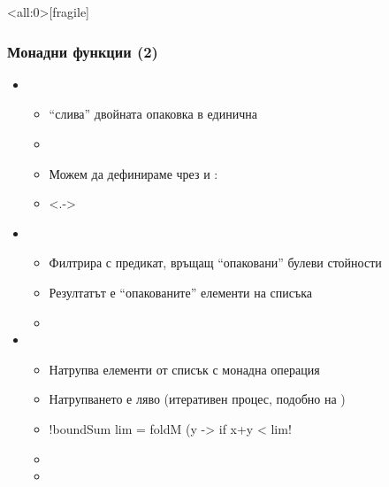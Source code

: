 \documentclass[alsotrans]{beamerswitch}
\begin{document}
\begin{frame}<all:0>[fragile]
  \frametitle{Монадни функции (2)}
  \begin{fixedarea}
    \begin{itemize}[<+->]
    \item {}
      \begin{itemize}
      \item ``слива'' двойната опаковка в единична
      \item {}
      \item Можем да дефинираме \lst{(>>=)} чрез  и :
      \item<.->  
      \end{itemize}
    \item {}
      \begin{itemize}
      \item Филтрира с предикат, връщащ ``опаковани'' булеви стойности
      \item Резултатът е ``опакованите'' елементи на списъка
      \item {}
      \end{itemize}
    \item {}
      \begin{itemize}
      \item Натрупва елементи от списък с монадна операция
      \item Натрупването е ляво (итеративен процес, подобно на )
      \item
        \lst!boundSum lim = foldM (\x y -> if x+y < lim!\\
        \hspace{30ex}
      \item {}
      \item {}
      \end{itemize}
    \end{itemize}
  \end{fixedarea}
\end{frame}
\end{document}
